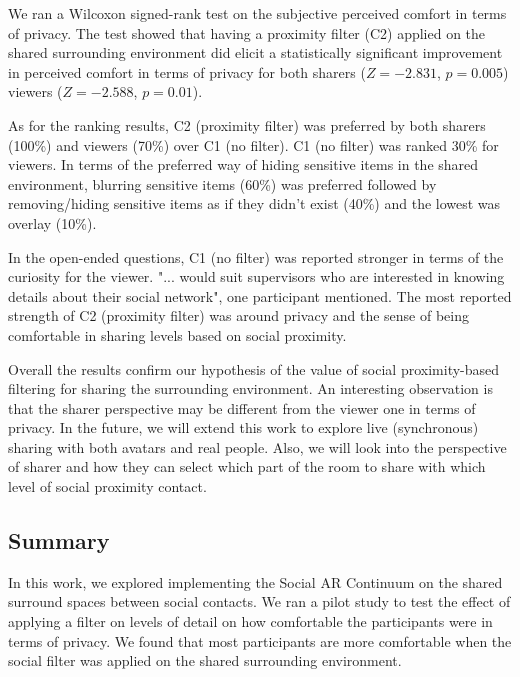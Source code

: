 We ran a Wilcoxon signed-rank test on the subjective perceived comfort in terms of privacy. The test showed that having a proximity filter (C2) applied on the shared surrounding environment did elicit a statistically significant improvement in perceived comfort in terms of privacy for both sharers ($Z=-2.831$, $p=0.005$) viewers ($Z=-2.588$, $p=0.01$). 

As for the ranking results, C2 (proximity filter) was preferred by both sharers (100\%) and viewers (70\%) over C1 (no filter). C1 (no filter) was ranked 30\% for viewers. In terms of the preferred way of hiding sensitive items in the shared environment, blurring sensitive items (60\%) was preferred followed by removing/hiding sensitive items as if they didn't exist (40\%) and the lowest was overlay (10\%). 

In the open-ended questions, C1 (no filter) was reported stronger in terms of the curiosity for the viewer. "... would suit supervisors who are interested in knowing details about their social network", one participant mentioned. The most reported strength of C2 (proximity filter) was around privacy and the sense of being comfortable in sharing levels based on social proximity. 

Overall the results confirm our hypothesis of the value of social proximity-based filtering for sharing the surrounding environment. An interesting observation is that the sharer perspective may be different from the viewer one in terms of privacy. In the future, we will extend this work to explore live (synchronous) sharing with both avatars and real people. Also, we will look into the perspective of sharer and how they can select which part of the room to share with which level of social proximity contact.

\subsection{Summary}

In this work, we explored implementing the Social AR Continuum on the shared surround spaces between social contacts. We ran a pilot study to test the effect of applying a filter on levels of detail on how comfortable the participants were in terms of privacy. We found that most participants are more comfortable when the social filter was applied on the shared surrounding environment. 